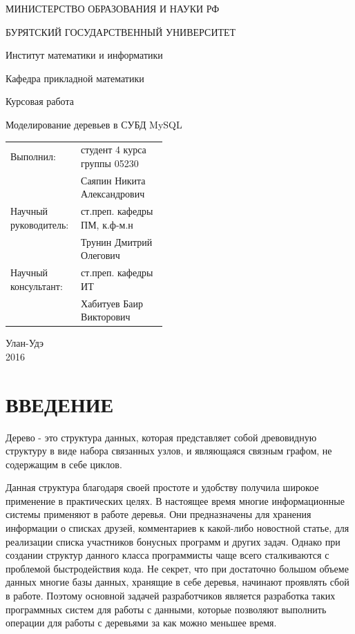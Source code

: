 \documentclass[a4paper,14pt]{extreport}
\theoremstyle{definition}
\renewcommand{\Large}{\fontsize{20}{25pt}\selectfont}
\begin{document}
\begin{titlepage}
\thispagestyle{empty}
\begin{center}

МИНИСТЕРСТВО ОБРАЗОВАНИЯ И НАУКИ РФ

БУРЯТСКИЙ ГОСУДАРСТВЕННЫЙ УНИВЕРСИТЕТ

Институт математики и информатики

Кафедра прикладной математики
\end{center}

\vspace{2 cm}
\begin{center}
Курсовая работа
\end{center}
\begin{center}
\Large Моделирование деревьев \linebreak в СУБД MySQL
\end{center}
\vspace{3em}
\begin{table}[h!]
\begin{tabular}{p{0.45\linewidth}l}
\hfill Выполнил: & студент 4 курса группы 05230\\
                        & Саяпин Никита Александрович \\
\hfill Научный руководитель: & ст.преп. кафедры ПМ, к.ф-м.н \\
                        & Трунин Дмитрий Олегович \\
\hfill Научный консультант: & ст.преп. кафедры ИТ \\
                        & Хабитуев Баир Викторович \\
\end{tabular}
\end{table}
\vspace{\fill}
\begin{center} Улан-Удэ \\ 2016
\end{center}
\end{titlepage}
\setcounter{page}{2}
\tableofcontents{}
\chapter*{ВВЕДЕНИЕ}
Дерево - это структура данных, которая представляет собой древовидную структуру в виде набора связанных узлов, и являющаяся связным графом, не содержащим в себе циклов\cite{Kormen}.

Данная структура благодаря своей простоте и удобству получила широкое применение в практических целях. В настоящее время многие информационные системы применяют в работе деревья. Они предназначены для хранения информации о списках друзей, комментариев к какой-либо новостной статье, для реализации списка участников бонусных программ и других задач. Однако при создании структур данного класса программисты чаще всего сталкиваются с проблемой быстродействия кода. Не секрет, что при достаточно большом объеме данных многие базы данных, хранящие в себе деревья, начинают проявлять сбой в работе. Поэтому основной задачей разработчиков является разработка таких программных систем для работы с данными, которые позволяют выполнить операции для работы с деревьями за как можно меньшее время.
\end{document}
